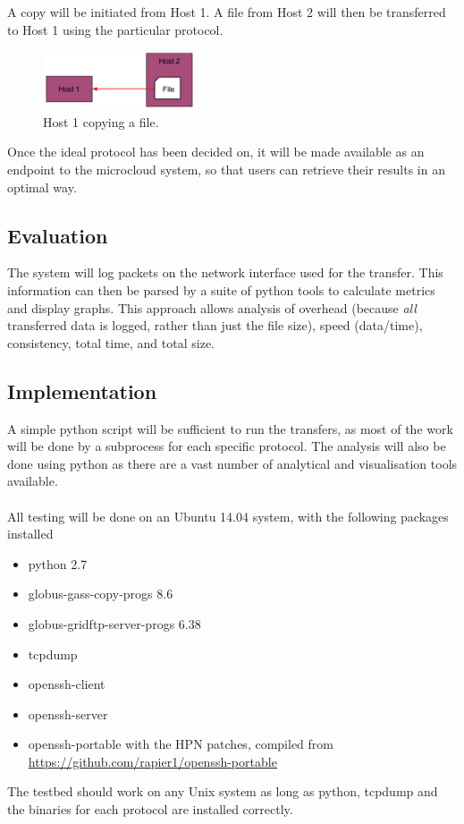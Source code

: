 \documentclass{sig-alternate-05-2015}
\begin{document}
A copy will be initiated from Host 1. A file from Host 2 will then be transferred to Host 1 using the particular protocol.
\begin{figure}[H]
	\label{fig:copy_example}
	\centering
	\includegraphics[width=0.4\textwidth]{img/basic_transfer_example.png}
	\caption{Host 1 copying a file.}
\end{figure}
Once the ideal protocol has been decided on, it will be made available as an endpoint to the microcloud system, so that users can retrieve their results in an optimal way.

\subsection{Evaluation}
The system will log packets on the network interface used for the transfer. This information can then be parsed by a suite of python tools to calculate metrics and display graphs.
This approach allows analysis of overhead (because \textit{all} transferred data is logged, rather than just the file size), speed (data/time), consistency, total time, and total size.

\subsection{Implementation}
A simple python script will be sufficient to run the transfers, as most of the work will be done by a subprocess for each specific protocol. The analysis will also be done using python as there are a vast number of analytical and visualisation tools available.\\\\
All testing will be done on an Ubuntu 14.04 system, with the following packages installed
\begin{itemize}
	\item python 2.7
	\item globus-gass-copy-progs 8.6
	\item globus-gridftp-server-progs 6.38
	\item tcpdump
	\item openssh-client
	\item openssh-server
	\item openssh-portable with the HPN patches, compiled from \url{https://github.com/rapier1/openssh-portable}
\end{itemize}
The testbed should work on any Unix system as long as python, tcpdump and the binaries for each protocol are installed correctly.
\\\\
\end{document}
